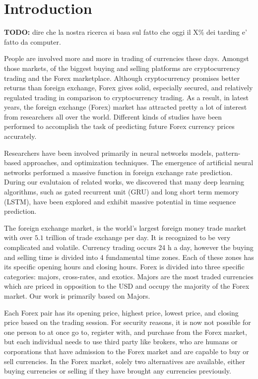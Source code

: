 \section{Introduction}

\textbf{TODO: } dire che la nostra ricerca si basa sul fatto che oggi il X\% dei tarding e' fatto da computer.

People are involved more and more in trading of currencies these days. Amongst those markets, of the biggest buying and selling platforms are cryptocurrency trading and the Forex marketplace.
Although cryptocurrency promises better returns than foreign exchange, Forex gives solid, especially secured, and relatively regulated trading in comparison to cryptocurrency trading.
As a result, in latest years, the foreign exchange (Forex) market has attracted pretty a lot of interest from researchers all over the world. Different kinds of studies have been performed to accomplish the task of predicting future Forex currency prices accurately.

Researchers have been involved primarily in neural networks models, pattern-based approaches, and optimization techniques. 
The emergence of artificial neural networks performed a massive function in foreign exchange rate prediction. During our evalutaion of related works, we discovered that many deep learning algorithms, such as gated recurrent unit (GRU) and long short term memory (LSTM), have been explored and exhibit massive potential in time sequence prediction.

The foreign exchange market, is the world’s largest foreign money trade market with over $5.1$ trillion of trade exchange per day. It is recognized to be very complicated and volatile. Currency trading occurs 24 h a day, however the buying and selling time is divided into 4 fundamental time zones. Each of these zones has its specific opening hours and closing hours.
Forex is divided into three specific categories: majors, cross-rates, and exotics. Majors are the most traded currencies which are priced in opposition to the USD and occupy the majority of the Forex market. Our work is primarily based on Majors.

Each Forex pair has its opening price, highest price, lowest price, and closing price based on the trading session. For security reasons, it is now not possible for one person to at once go to, register with, and purchase from the Forex market,  but each individual needs to use third party like brokers, who are humans or corporations that have admission to the Forex market and are capable to buy or sell currencies. In the Forex market, solely two alternatives are available, either buying currencies or selling if they have brought any currencies previously. 

